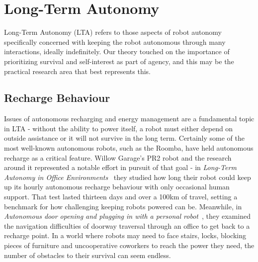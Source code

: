 \documentclass{sfuthesis}
\begin{document}







\section{Long-Term Autonomy}

Long-Term Autonomy (LTA) refers to those aspects of robot autonomy specifically concerned with keeping the robot autonomous through many interactions, ideally indefinitely. Our theory touched on the importance of prioritizing survival and self-interest as part of agency, and this may be the practical research area that best represents this.

\subsection{Recharge Behaviour}

Issues of autonomous recharging and energy management are a fundamental topic in LTA - without the ability to power itself, a robot must either depend on outside assistance or it will not survive in the long term. Certainly some of the most well-known autonomous robots, such as the Roomba, have held autonomous recharge as a critical feature. Willow Garage's PR2 robot and the research around it represented a notable effort in pursuit of that goal - in \textit{Long-Term Autonomy in Office Environments}~\cite{meeussen2011long} they studied how long their robot could keep up its hourly autonomous recharge behaviour with only occasional human support. That test lasted thirteen days and over a 100km of travel, setting a benchmark for how challenging keeping robots powered can be. Meanwhile, in \textit{Autonomous door opening and plugging in with a personal robot}~\cite{meeussen2010autonomous}, they examined the navigation difficulties of doorway traversal through an office to get back to a recharge point. In a world where robots may need to face stairs, locks, blocking pieces of furniture and uncooperative coworkers to reach the power they need, the number of obstacles to their survival can seem endless.
\end{document}
